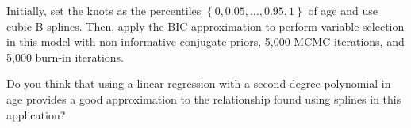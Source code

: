 \begin{enumerate}
	Initially, set the knots as the percentiles $\left\{0,0.05,\dots,0.95,1\right\}$ of age and use cubic B-splines. Then, apply the BIC approximation to perform variable selection in this model with non-informative conjugate priors, 5,000 MCMC iterations, and 5,000 burn-in iterations.
	
	Do you think that using a linear regression with a second-degree polynomial in age provides a good approximation to the relationship found using splines in this application?
  
\end{enumerate}

